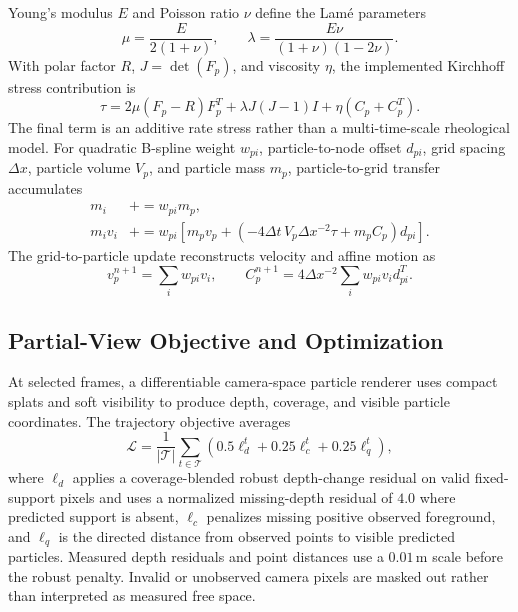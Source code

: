 Young's modulus $E$ and Poisson ratio $\nu$ define the Lam\'e parameters
\begin{equation}
 \mu=\frac{E}{2(1+\nu)},\qquad
 \lambda=\frac{E\nu}{(1+\nu)(1-2\nu)}.
 \label{eq:lame}
\end{equation}
With polar factor $R$, $J=\det(F_p)$, and viscosity $\eta$, the implemented Kirchhoff stress contribution is
\begin{equation}
 \tau=2\mu(F_p-R)F_p^T+\lambda J(J-1)I+\eta(C_p+C_p^T).
 \label{eq:stress}
\end{equation}
The final term is an additive rate stress rather than a multi-time-scale rheological model. For quadratic B-spline weight $w_{pi}$, particle-to-node offset $d_{pi}$, grid spacing $\Delta x$, particle volume $V_p$, and particle mass $m_p$, particle-to-grid transfer accumulates
\begin{align}
 m_i &\mathrel{+}=w_{pi}m_p,\\
 m_i v_i &\mathrel{+}=w_{pi}\!\left[m_pv_p+
 \left(-4\Delta t\,V_p\Delta x^{-2}\tau+m_pC_p\right)d_{pi}\right].
 \label{eq:p2g}
\end{align}
The grid-to-particle update reconstructs velocity and affine motion as
\begin{equation}
 v_p^{n+1}=\sum_i w_{pi}v_i,\qquad
 C_p^{n+1}=4\Delta x^{-2}\sum_i w_{pi}v_i d_{pi}^{T}.
 \label{eq:g2p}
\end{equation}

\subsection{Partial-View Objective and Optimization}

At selected frames, a differentiable camera-space particle renderer uses compact splats and soft visibility to produce depth, coverage, and visible particle coordinates. The trajectory objective averages
\begin{equation}
 \mathcal{L}=\frac{1}{|\mathcal{T}|}\sum_{t\in\mathcal{T}}
 \left(0.5\ell_d^t+0.25\ell_c^t+0.25\ell_q^t\right),
 \label{eq:training_loss}
\end{equation}
where $\ell_d$ applies a coverage-blended robust depth-change residual on valid fixed-support pixels and uses a normalized missing-depth residual of $4.0$ where predicted support is absent, $\ell_c$ penalizes missing positive observed foreground, and $\ell_q$ is the directed distance from observed points to visible predicted particles. Measured depth residuals and point distances use a $0.01\,$m scale before the robust penalty. Invalid or unobserved camera pixels are masked out rather than interpreted as measured free space.

